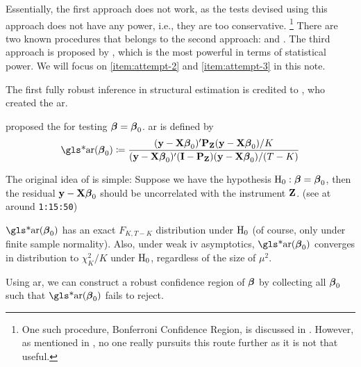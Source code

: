 \documentclass[a4paper]{article}
\begin{document}
Essentially, the first approach does not work,
as the tests devised using this approach does not have any power, i.e., they are too conservative.%
\footnote{
	One such procedure, Bonferroni Confidence Region, is discussed in \textcite{staiger-stock-1997}.
	However, as mentioned in \textcite{stock-2008}, no one really pursuits this route further as it is not that useful.
}
There are two known procedures that belongs to the second approach:  and .
The third approach is proposed by \textcite{moreira-2002},
which is the most powerful in terms of statistical power.
We will focus on \ref{item:attempt-2} and \ref{item:attempt-3} in this note.

The first fully robust inference in structural estimation is credited to \textcite{anderson-rubin-1949},
who created the \gls*{ar}.

\begin{definition}[\glsentrylong{ar}]\label{dfn:ar-1}
	\textcite{anderson-rubin-1949} proposed the  for testing $\boldsymbol{\beta}=\boldsymbol{\beta}_0$.
	\gls*{ar} is defined by
	\begin{align*}
		\text{\gls*{ar}}(\bbeta_0)
		\coloneqq
		\frac
		{ (\yy - \XX\bbeta_0)\T\PP_{\ZZ}(\yy - \XX\bbeta_0) / K }
		{ (\yy - \XX\bbeta_0)\T (\II-\PP_{\ZZ}) (\yy - \XX\bbeta_0) / (T - K) }
	\end{align*}
\end{definition}

\begin{remark}
	The original idea of \textcite{anderson-rubin-1949} is simple:
	Suppose we have the hypothesis $\mathrm{H}_0:\boldsymbol{\beta}=\boldsymbol{\beta}_0$,
	then the residual $\mathbf{y}-\mathbf{X}\boldsymbol{\beta}_0$ should be uncorrelated with the instrument $\mathbf{Z}$.
	(see \textcite{stock-2008} at around \texttt{1:15:50})
\end{remark}

\begin{remark}
	$\text{\gls*{ar}}(\bbeta_0)$ has an exact $F_{K,T-K}$ distribution under $\mathrm{H}_0$ (of course, only under finite sample normality).
	Also, under weak \gls*{iv} asymptotics,
	$\text{\gls*{ar}}(\bbeta_0)$ converges in distribution to $\chi_{K}^2/K$ under $\mathrm{H}_0$,
	regardless of the size of $\mu^2$.
	\parencite{stock-wright-yogo-2002}
\end{remark}

\begin{remark}
	Using \gls*{ar},
	we can construct a robust confidence region of $\boldsymbol{\beta}$
	by collecting all $\boldsymbol{\beta}_0$ such that $\text{\gls*{ar}}(\bbeta_0)$ fails to reject.
	\parencite{staiger-stock-1997}
\end{remark}
\end{document}
